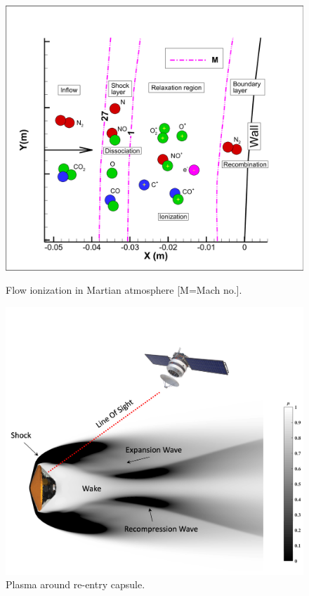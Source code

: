 \documentclass[11pt,sans]{wlscirep} %
\begin{document}
\begin{figure}[H]
     \begin{minipage}{.45\textwidth}
        \centering
        \includegraphics[trim={2cm 1cm 1cm 3cm},clip,scale=0.17]{figures/flowfeatures_molecules_noT_CO2_2.png}
        \caption{Flow ionization in Martian atmosphere [M=Mach no.]\cite{sharma2024mhd}.}%
        \label{fig:exomars_ionization}
    \end{minipage}
    \hfill
    \begin{minipage}{0.45\textwidth}
        \centering
        \includegraphics[trim={1.5cm 5cm 18cm 12cm},clip,scale=0.13]{figures/Flow_Sketch.jpg}
        \caption{Plasma around re-entry capsule\cite{giangaspero20233d}.}%
        \label{fig:blackout}
    \end{minipage}
\end{figure}\vspace{-15pt}
\end{document}
